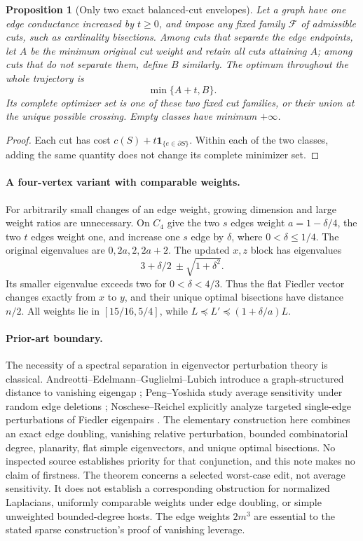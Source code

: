 \documentclass[11pt]{article}
\newtheorem{proposition}[theorem]{Proposition}
\newcommand{\one}{\boldsymbol 1}
\begin{document}
\begin{proposition}[Only two exact balanced-cut envelopes]
Let a graph have one edge conductance increased by $t\ge0$, and impose
any fixed family $\mathcal F$ of admissible cuts, such as cardinality
bisections. Among cuts that separate the edge endpoints, let $A$ be the
minimum original cut weight and retain all cuts attaining $A$; among
cuts that do not separate them, define $B$ similarly. The optimum
throughout the whole trajectory is
\[
                          \min\{A+t,B\}.
\]
Its complete optimizer set is one of these two fixed cut families,
or their union at the unique possible crossing. Empty classes have
minimum $+\infty$.
\end{proposition}
\begin{proof}
Each cut has cost $c(S)+t\one_{\{e\in\partial S\}}$. Within each of
the two classes, adding the same quantity does not change its complete
minimizer set.
\end{proof}

\paragraph{A four-vertex variant with comparable weights.}
For arbitrarily small changes of an edge weight, growing dimension and
large weight ratios are unnecessary. On $C_4$ give the two $s$ edges
weight $a=1-\delta/4$, the two $t$ edges weight one, and increase one
$s$ edge by $\delta$, where $0<\delta\le1/4$. The original eigenvalues
are $0,2a,2,2a+2$. The updated $x,z$ block has eigenvalues
\[
       3+\delta/2\ \pm\sqrt{1+\delta^2}.
\]
Its smaller eigenvalue exceeds two for $0<\delta<4/3$.
Thus the flat Fiedler vector changes exactly from $x$ to $y$, and their
unique optimal bisections have distance $n/2$. All weights lie in
$[15/16,5/4]$, while
$L\preceq L'\preceq(1+\delta/a)L$.

\paragraph{Prior-art boundary.}
The necessity of a spectral separation in eigenvector perturbation
theory is classical. Andreotti--Edelmann--Guglielmi--Lubich introduce a
graph-structured distance to vanishing eigengap
\cite{AEGL}; Peng--Yoshida study average sensitivity under random edge
deletions \cite{PY}; Noschese--Reichel explicitly analyze targeted
single-edge perturbations of Fiedler eigenpairs \cite{NR}.
The elementary construction here combines an exact edge doubling,
vanishing relative perturbation, bounded combinatorial degree,
planarity, flat simple eigenvectors, and unique optimal bisections.
No inspected source establishes priority for that conjunction, and
this note makes no claim of firstness. The theorem concerns a selected
worst-case edit, not average sensitivity. It does not establish a
corresponding obstruction for normalized Laplacians, uniformly
comparable weights under edge doubling, or simple unweighted
bounded-degree hosts. The edge weights $2m^3$ are essential to the
stated sparse construction's proof of vanishing leverage.
\end{document}
